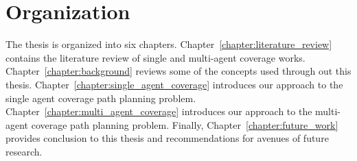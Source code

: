 \documentclass[../main.tex]{subfiles}
\begin{document}
\section{Organization}
\label{section:organization}

The thesis is organized into six chapters. Chapter~\ref{chapter:literature_review} contains the literature review of single and multi-agent coverage works. Chapter~\ref{chapter:background} reviews some of the concepts used through out this thesis. Chapter~\ref{chapter:single_agent_coverage} introduces our approach to the single agent coverage path planning problem. Chapter~\ref{chapter:multi_agent_coverage} introduces our approach to the multi-agent coverage path planning problem. Finally, Chapter~\ref{chapter:future_work} provides conclusion to this thesis and recommendations for avenues of future research.
\end{document}
